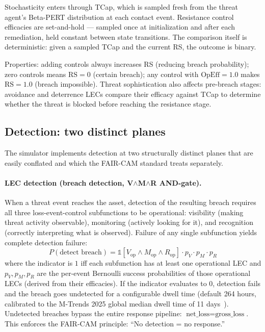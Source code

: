 \documentclass[11pt,a4paper]{article}
\begin{document}
Stochasticity enters through TCap, which is sampled fresh from the threat agent's Beta-PERT distribution at each contact event. Resistance control efficacies are set-and-hold --- sampled once at initialization and after each remediation, held constant between state transitions. The comparison itself is deterministic: given a sampled TCap and the current RS, the outcome is binary.

Properties: adding controls always increases RS (reducing breach probability); zero controls means $\mathrm{RS} = 0$ (certain breach); any control with $\mathrm{OpEff} = 1.0$ makes $\mathrm{RS} = 1.0$ (breach impossible). Threat sophistication also affects pre-breach stages: avoidance and deterrence LECs compare their efficacy against TCap to determine whether the threat is blocked before reaching the resistance stage.

\subsection{Detection: two distinct planes}
\label{sec:detect}

The simulator implements detection at two structurally distinct planes that are easily conflated and which the FAIR-CAM standard treats separately.

\paragraph{LEC detection (breach detection, V$\wedge$M$\wedge$R AND-gate).} When a threat event reaches the asset, detection of the resulting breach requires all three loss-event-control subfunctions to be operational: visibility (making threat activity observable), monitoring (actively looking for it), and recognition (correctly interpreting what is observed). Failure of any single subfunction yields complete detection failure:
\begin{equation}
    P(\text{detect breach}) = \mathbb{1}[V_{\text{op}} \wedge M_{\text{op}} \wedge R_{\text{op}}] \cdot p_{V} \cdot p_{M} \cdot p_{R}
    \label{eq:detect-and}
\end{equation}
where the indicator is $1$ iff each subfunction has at least one operational LEC and $p_{V}, p_{M}, p_{R}$ are the per-event Bernoulli success probabilities of those operational LECs (derived from their efficacies). If the indicator evaluates to $0$, detection fails and the breach goes undetected for a configurable dwell time (default 264 hours, calibrated to the M-Trends 2025 global median dwell time of 11 days~\citep{MTrends2025}). Undetected breaches bypass the entire response pipeline: $\text{net\_loss} = \text{gross\_loss}$. This enforces the FAIR-CAM principle: ``No detection = no response.''
\end{document}
